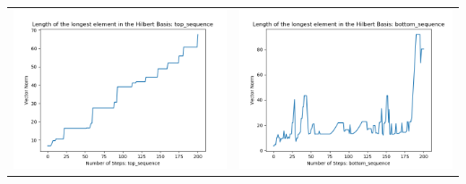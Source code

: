 \documentclass[10pt]{article}
\begin{document}
\begin{tabular}{c|c}
\begin{minipage}{.45\textwidth}
\includegraphics[width=\textwidth]{"DATA/5d/6 generators 2 bound B/top_sequence LENGTH"}
\end{minipage} &
\begin{minipage}{.45\textwidth}
\includegraphics[width=\textwidth]{"DATA/5d/6 generators 2 bound B bottomup/bottom_sequence LENGTH"}
\end{minipage}
\end{tabular}
\end{document}
